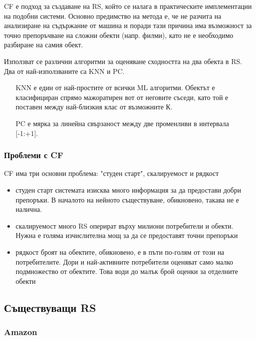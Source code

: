 		\ac{CF} е подход за създаване на \ac{RS}, който се налага в практическите имплементации на подобни системи. Основно предимство
		на метода е, че не разчита на анализиране на съдържание от машина и поради тази причина има възможност за точно препоръчване на
		сложни обекти (напр. филми), като не е необходимо разбиране на самия обект.
		
		Използват се различни алгоритми за оценяване сходността на два обекта в \ac{RS}. Два от най-използваните са \ac{KNN} и \ac{PC}.
		
		\begin{itemize}
			\item[\ac{KNN}] е един от най-простите от всички \ac{ML} алгоритми. Обектът е класифициран спрямо мажоратирен вот от неговите съседи, като той е поставен между най-близкия клас от възможните К.
			\item[\ac{PC}] е мярка за линейна свързаност между две променливи в интервала [-1:+1].
		\end{itemize}
		
	\subsubsection{Проблеми с \ac{CF}}
		
		\ac{CF} има три основни проблема: "студен старт", скалируемост и рядкост
		
		\begin{itemize}
			\item студен старт системата изисква много информация за да предостави добри препоръки. В началото на нейното съществуване, обикновено, такава не е налична.
			\item скалируемост много \ac{RS} оперират върху милиони потребители и обекти. Нужна е голяма изчислителна мощ за да се предоставят точни препоръки
			\item рядкост броят на обектите, обикновено, е в пъти по-голям от този на потребителите. Дори и най-активните потребители оценяват само малко подмножество от обектите. Това води до малък брой оценки за отделните обекти
		\end{itemize}
		
	\subsection{Съществуващи \ac{RS}}
	
	\subsubsection{Amazon}
	
